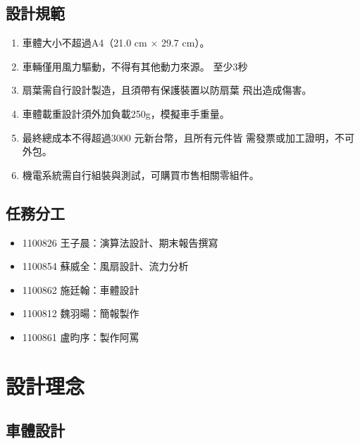 \documentclass[12pt]{article}       %
\begin{document}
\subsection{設計規範} 
\hspace{2em}
\begin{enumerate}
    \item 車體大小不超過A4（21.0 cm $\times$ 29.7 cm）。 
    \item 車輛僅用風力驅動，不得有其他動力來源。 
    至少3秒
    \item 扇葉需自行設計製造，且須帶有保護裝置以防扇葉 
    飛出造成傷害。 
    \item 車體載重設計須外加負載250g，模擬車手重量。 
    \item 最終總成本不得超過3000 元新台幣，且所有元件皆 
    需發票或加工證明，不可外包。 
    \item 機電系統需自行組裝與測試，可購買市售相關零組件。 
\end{enumerate}

\subsection{任務分工} 


\begin{itemize}
    \item 1100826 王子晨：演算法設計、期末報告撰寫
    \item 1100854 蘇威全：風扇設計、流力分析
    \item 1100862 施廷翰：車體設計
    \item 1100812 魏羽暘：簡報製作
    \item 1100861 盧昀序：製作阿罵
\end{itemize}


\section{\centering 設計理念}

\subsection{車體設計} 
\end{document}
